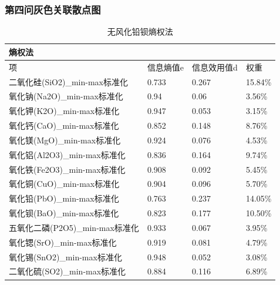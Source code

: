 \documentclass[UTF8]{ctexart}
\begin{document}
\subsubsection*{第四问灰色关联散点图}
\begin{table}[H]
    \centering
    \caption{无风化铅钡熵权法}
    \begin{tabular}{|l|l|l|l|}
        \hline
        熵权法                          & ~         & ~           & ~       \\ \hline
        项                              & 信息熵值e & 信息效用值d & 权重    \\ \hline
        二氧化硅(SiO2)\_min-max标准化   & 0.733     & 0.267       & 15.84\% \\ \hline
        氧化钠(Na2O)\_min-max标准化     & 0.94      & 0.06        & 3.56\%  \\ \hline
        氧化钾(K2O)\_min-max标准化      & 0.947     & 0.053       & 3.15\%  \\ \hline
        氧化钙(CaO)\_min-max标准化      & 0.852     & 0.148       & 8.76\%  \\ \hline
        氧化镁(MgO)\_min-max标准化      & 0.924     & 0.076       & 4.53\%  \\ \hline
        氧化铝(Al2O3)\_min-max标准化    & 0.836     & 0.164       & 9.74\%  \\ \hline
        氧化铁(Fe2O3)\_min-max标准化    & 0.908     & 0.092       & 5.45\%  \\ \hline
        氧化铜(CuO)\_min-max标准化      & 0.904     & 0.096       & 5.70\%  \\ \hline
        氧化铅(PbO)\_min-max标准化      & 0.763     & 0.237       & 14.05\% \\ \hline
        氧化钡(BaO)\_min-max标准化      & 0.823     & 0.177       & 10.50\% \\ \hline
        五氧化二磷(P2O5)\_min-max标准化 & 0.933     & 0.067       & 3.95\%  \\ \hline
        氧化锶(SrO)\_min-max标准化      & 0.919     & 0.081       & 4.79\%  \\ \hline
        氧化锡(SnO2)\_min-max标准化     & 0.948     & 0.052       & 3.08\%  \\ \hline
        二氧化硫(SO2)\_min-max标准化    & 0.884     & 0.116       & 6.89\%  \\ \hline
    \end{tabular}
\end{table}
\end{document}
